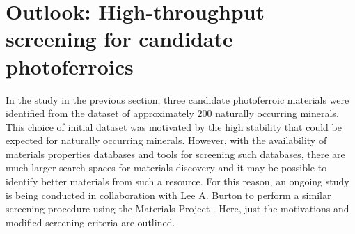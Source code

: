 \documentclass[11pt, twoside]{report}
\begin{document}


\section{Outlook: High-throughput screening for candidate photoferroics}



In the study in the previous section, three candidate photoferroic materials were identified from the dataset of approximately 200 naturally occurring minerals. This choice of initial dataset was motivated by the high stability that could be expected for naturally occurring minerals. However, with the availability of materials properties databases and tools for screening such databases, there are much larger search spaces for materials discovery and it may be possible to identify better materials from such a resource. For this reason, an ongoing study is being conducted in collaboration with Lee A. Burton to perform a similar screening procedure using the Materials Project \cite{materials_project}. Here, just the motivations and modified screening criteria are outlined.
\end{document}
